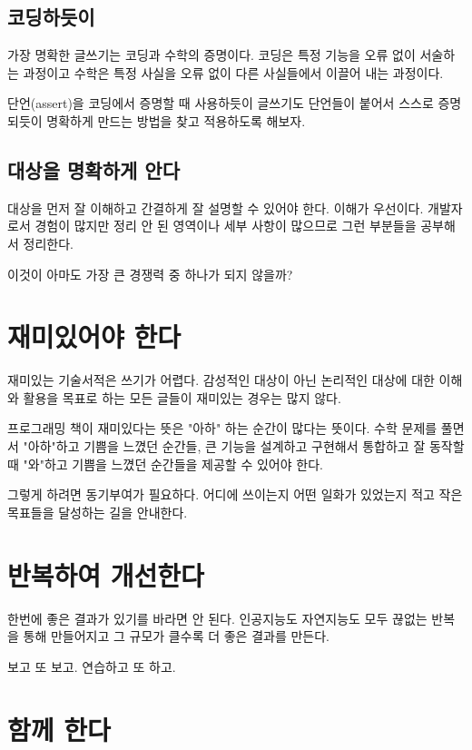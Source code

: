 \subsection{코딩하듯이}

가장 명확한 글쓰기는 코딩과 수학의 증명이다. 코딩은 특정 기능을 오류 없이 서술하는 과정이고 
수학은 특정 사실을 오류 없이 다른 사실들에서 이끌어 내는 과정이다. 

단언(assert)을 코딩에서 증명할 때 사용하듯이 글쓰기도 단언들이 붙어서 스스로 증명되듯이 
명확하게 만드는 방법을 찾고 적용하도록 해보자. 

\subsection{대상을 명확하게 안다}

대상을 먼저 잘 이해하고 간결하게 잘 설명할 수 있어야 한다. 이해가 우선이다. 개발자로서
경험이 많지만 정리 안 된 영역이나 세부 사항이 많으므로 그런 부분들을 공부해서 정리한다. 

이것이 아마도 가장 큰 경쟁력 중 하나가 되지 않을까? 

\section{재미있어야 한다}

재미있는 기술서적은 쓰기가 어렵다. 감성적인 대상이 아닌 논리적인 대상에 대한 
이해와 활용을 목표로 하는 모든 글들이 재미있는 경우는 많지 않다. 

프로그래밍 책이 재미있다는 뜻은 "아하" 하는 순간이 많다는 뜻이다. 수학 문제를 풀면서 
"아하"하고 기쁨을 느꼈던 순간들, 큰 기능을 설계하고 구현해서 통합하고 잘 동작할 때 
"와"하고 기쁨을 느꼈던 순간들을 제공할 수 있어야 한다. 

그렇게 하려면 동기부여가 필요하다. 어디에 쓰이는지 어떤 일화가 있었는지 적고 
작은 목표들을 달성하는 길을 안내한다. 

\section{반복하여 개선한다}

한번에 좋은 결과가 있기를 바라면 안 된다. 인공지능도 자연지능도 모두 끊없는 반복을 통해 
만들어지고 그 규모가 클수록 더 좋은 결과를 만든다. 

보고 또 보고. 연습하고 또 하고. 

\section{함께 한다}

